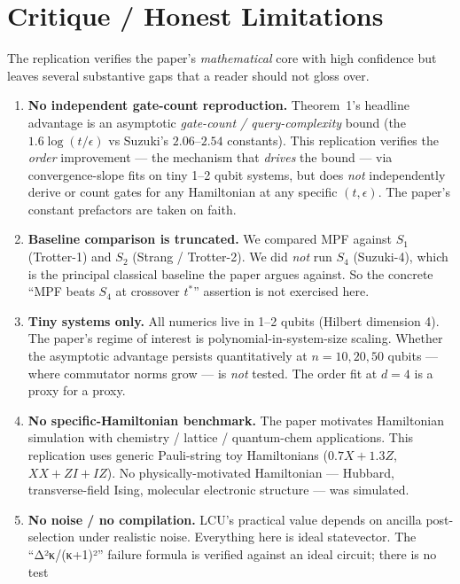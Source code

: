 \documentclass[11pt]{article}
\begin{document}
\section{Critique / Honest Limitations}

The replication verifies the paper's \emph{mathematical} core with high confidence but leaves
several substantive gaps that a reader should not gloss over.

\begin{enumerate}
  \item \textbf{No independent gate-count reproduction.} Theorem~1's headline advantage is an
        asymptotic \emph{gate-count / query-complexity} bound (the $1.6 \log(t/\epsilon)$ vs
        Suzuki's $2.06$--$2.54$ constants). This replication verifies the \emph{order}
        improvement --- the mechanism that \emph{drives} the bound --- via convergence-slope
        fits on tiny 1--2 qubit systems, but does \emph{not} independently derive or count
        gates for any Hamiltonian at any specific $(t, \epsilon)$. The paper's constant
        prefactors are taken on faith.
  \item \textbf{Baseline comparison is truncated.} We compared MPF against $S_1$ (Trotter-1)
        and $S_2$ (Strang / Trotter-2). We did \emph{not} run $S_4$ (Suzuki-4), which is the
        principal classical baseline the paper argues against. So the concrete
        ``MPF beats $S_4$ at crossover $t^*$'' assertion is not exercised here.
  \item \textbf{Tiny systems only.} All numerics live in 1--2 qubits (Hilbert dimension 4).
        The paper's regime of interest is polynomial-in-system-size scaling. Whether the
        asymptotic advantage persists quantitatively at $n=10, 20, 50$ qubits --- where
        commutator norms grow --- is \emph{not} tested. The order fit at $d=4$ is a proxy
        for a proxy.
  \item \textbf{No specific-Hamiltonian benchmark.} The paper motivates Hamiltonian simulation
        with chemistry / lattice / quantum-chem applications. This replication uses generic
        Pauli-string toy Hamiltonians ($0.7X + 1.3Z$, $XX+ZI+IZ$). No physically-motivated
        Hamiltonian --- Hubbard, transverse-field Ising, molecular electronic structure ---
        was simulated.
  \item \textbf{No noise / no compilation.} LCU's practical value depends on ancilla
        post-selection under realistic noise. Everything here is ideal statevector. The
        ``Δ²κ/(κ+1)²'' failure formula is verified against an ideal circuit; there is no test

\end{enumerate}
\end{document}
